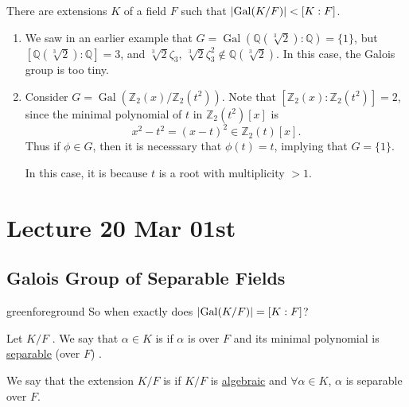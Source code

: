 \documentclass[notoc,notitlepage,nobib]{tufte-book}
\DeclareMathOperator{\Gal}{Gal}
\begin{document}
\begin{warning}
  There are extensions $K$ of a field $F$ such that $\abs{\Gal(K / F)} < [ K : F ]$.
  \begin{enumerate}
    \item We saw in an earlier example that $G = \Gal( \mathbb{Q}(\sqrt[3]{2}) :
      \mathbb{Q} ) = \{ 1 \}$, but $[ \mathbb{Q}(\sqrt[3]{2}) : \mathbb{Q} ] =
      3$, and $\sqrt[3]{2} \zeta_3, \, \sqrt[3]{2} \zeta_3^2 \notin
      \mathbb{Q}(\sqrt[3]{2})$. In this case, the Galois group is too tiny.
    \item Consider $G = \Gal( \mathbb{Z}_2(x) / \mathbb{Z}_2(t^2) )$. Note that
      $[\mathbb{Z}_2(x) : \mathbb{Z}_2(t^2)] = 2$, since the minimal polynomial
      of $t$ in $\mathbb{Z}_2(t^2)[x]$ is
      \begin{equation*}
        x^2 - t^2 = (x - t)^2 \in \mathbb{Z}_2(t)[x].
      \end{equation*}
      Thus if $\phi \in G$, then it is necesssary that $\phi(t) = t$, implying
      that $G = \{ 1 \}$.

      In this case, it is because $t$ is a root with multiplicity $> 1$.
  \end{enumerate}
\end{warning}



\chapter{Lecture 20 Mar 01st}%
\label{chp:lecture_20_mar_01st}

\section{Galois Group of Separable Fields}%
\label{sec:galois_group_of_separable_fields}

\begin{quotebox}{green}{foreground}
  So when exactly does $\abs{ \Gal(K / F) } = [ K : F ]$?
\end{quotebox}

\begin{defn}\label{defn:separable_elements_and_separable_extensions}
  Let $K / F$ . We say that
  $\alpha \in K$ is  if $\alpha$ is  over
  $F$ and its minimal polynomial is
  \hyperref[defn:separable_polynomials]{separable} (over $F$) .

  We say that the extension $K / F$ is  if $K / F$ is
  \hyperref[defn:algebraic_and_transcendental]{algebraic} and $\forall \alpha
  \in K$, $\alpha$ is separable over $F$.
\end{defn}
\end{document}
